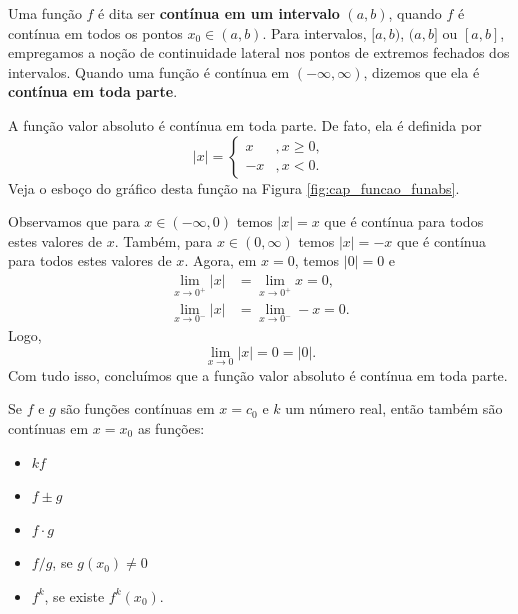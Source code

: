 Uma função $f$ é dita ser {\bf contínua em um intervalo} $(a, b)$, quando $f$ é contínua em todos os pontos $x_0\in (a, b)$. Para intervalos, $[a, b)$, $(a, b]$ ou $[a, b]$, empregamos a noção de continuidade lateral nos pontos de extremos fechados dos intervalos. Quando uma função é contínua em $(-\infty, \infty)$, dizemos que ela é {\bf contínua em toda parte}.

\begin{ex}\label{ex:lim_fabs_cont}
  A função valor absoluto é contínua em toda parte. De fato, ela é definida por
  \begin{equation}
    |x| = \left\{
      \begin{array}{ll}
        x &, x\geq 0,\\
        -x &, x<0.
      \end{array}
    \right.
  \end{equation}
  Veja o esboço do gráfico desta função na Figura \ref{fig:cap_funcao_funabs}.
  
  Observamos que para $x\in(-\infty, 0)$ temos $|x| = x$ que é contínua para todos estes valores de $x$. Também, para $x\in(0,\infty)$ temos $|x|=-x$ que é contínua para todos estes valores de $x$. Agora, em $x=0$, temos $|0|=0$ e
  \begin{align}
    \lim_{x\to 0^+} |x| &= \lim_{x\to 0^+} x = 0,\\
    \lim_{x\to 0^-} |x| &= \lim_{x\to 0^-} -x = 0.
  \end{align}
  Logo,
  \begin{equation}
    \lim_{x\to 0} |x| = 0 = |0|.
  \end{equation}
  Com tudo isso, concluímos que a função valor absoluto é contínua em toda parte.
\end{ex}

\begin{prop}
  Se $f$ e $g$ são funções contínuas em $x=c_0$ e $k$ um número real, então também são contínuas em $x=x_0$ as funções:
  \begin{itemize}
  \item $kf$
  \item $f\pm g$
  \item $f\cdot g$
  \item $f/g$, se $g(x_0)\neq 0$
  \item $f^k$, se existe $f^k(x_0)$.
  \end{itemize}
\end{prop}

